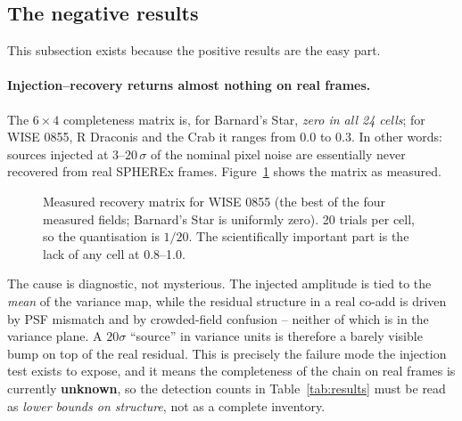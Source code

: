 \documentclass[11pt,a4paper]{article}
\begin{document}
\subsection{The negative results}
\label{sec:failures}

This subsection exists because the positive results are the easy part.

\paragraph{Injection--recovery returns almost nothing on real frames.} The $6\times4$ completeness
matrix is, for Barnard's Star, \emph{zero in all 24 cells}; for WISE 0855, R Draconis and the Crab it
ranges from 0.0 to 0.3. In other words: sources injected at $3$--$20\,\sigma$ of the nominal pixel noise
are essentially never recovered from real SPHEREx frames. Figure~\ref{fig:recovery} shows the matrix
as measured.

\begin{figure}[H]
\centering
{}
\caption{Measured recovery matrix for WISE 0855 (the best of the four measured fields; Barnard's Star
is uniformly zero). 20 trials per cell, so the quantisation is $1/20$. The scientifically important
part is the lack of any cell at 0.8--1.0.}
\label{fig:recovery}
\end{figure}

The cause is diagnostic, not mysterious. The injected amplitude is tied to the \emph{mean} of the
variance map, while the residual structure in a real co-add is driven by PSF mismatch and by
crowded-field confusion -- neither of which is in the variance plane. A $20\sigma$ ``source'' in
variance units is therefore a barely visible bump on top of the real residual. This is precisely the
failure mode the injection test exists to expose, and it means the completeness of the chain on real
frames is currently \textbf{unknown}, so the detection counts in Table~\ref{tab:results} must be read
as \emph{lower bounds on structure}, not as a complete inventory.
\end{document}
